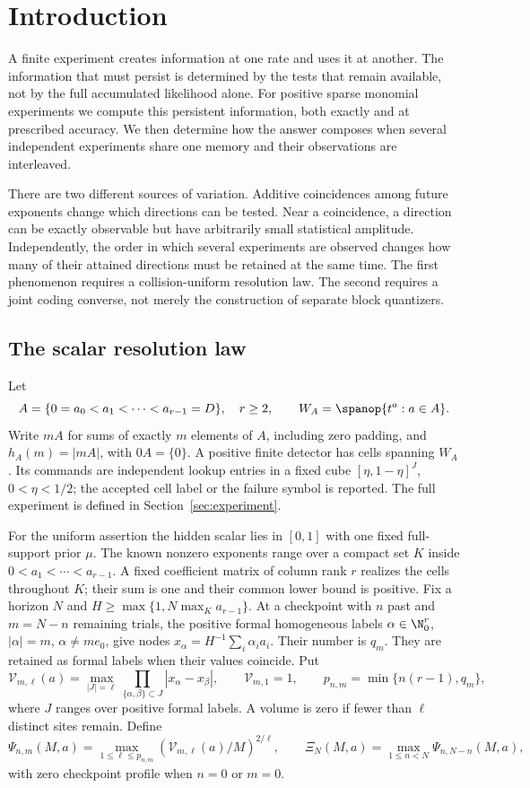 \section{Introduction}
A finite experiment creates information at one rate and uses it at
another. The information that must persist is determined by the tests
that remain available, not by the full accumulated likelihood alone.
For positive sparse monomial experiments we compute this persistent
information, both exactly and at prescribed accuracy. We then determine
how the answer composes when several independent experiments share one
memory and their observations are interleaved.

There are two different sources of variation. Additive coincidences among
future exponents change which directions can be tested. Near a coincidence,
a direction can be exactly observable but have arbitrarily small
statistical amplitude. Independently, the order in which several
experiments are observed changes how many of their attained directions
must be retained at the same time. The first phenomenon requires a
collision-uniform resolution law. The second requires a joint coding
converse, not merely the construction of separate block quantizers.

\subsection{The scalar resolution law}
Let
\[
 A=\{0=a_0<a_1<\cdots<a_{r-1}=D\},\quad r\ge2,
 \qquad W_A=\spanop\{t^a:a\in A\}.
\]
Write $mA$ for sums of exactly $m$ elements of $A$, including zero
padding, and $h_A(m)=|mA|$, with $0A=\{0\}$. A positive finite
detector has cells spanning $W_A$. Its commands are independent lookup
entries in a fixed cube $[\eta,1-\eta]^J$, $0<\eta<1/2$; the
accepted cell label or the failure symbol is reported. The full experiment
is defined in Section~\ref{sec:experiment}.

For the uniform assertion the hidden scalar lies in $[0,1]$ with one
fixed full-support prior $\mu$. The known nonzero exponents range over
a compact set $K$ inside $0<a_1<\cdots<a_{r-1}$. A fixed coefficient
matrix of column rank $r$ realizes the cells throughout $K$; their sum
is one and their common lower bound is positive. Fix a horizon $N$ and
$H\ge\max\{1,N\max_Ka_{r-1}\}$. At a checkpoint with $n$ past and
$m=N-n$ remaining trials, the positive formal homogeneous labels
$\alpha\in\N_0^r$, $|\alpha|=m$, $\alpha\ne me_0$, give nodes
$x_\alpha=H^{-1}\sum_i\alpha_i a_i$. Their number is $q_m$.
They are retained as formal labels when their values coincide. Put
\[
 \mathcal V_{m,\ell}(a)=
 \max_{|J|=\ell}\prod_{\{\alpha,\beta\}\subset J}|x_\alpha-x_\beta|,
 \qquad \mathcal V_{m,1}=1,
 \qquad p_{n,m}=\min\{n(r-1),q_m\},
\]
where $J$ ranges over positive formal labels. A volume is zero if fewer
than $\ell$ distinct sites remain. Define
\[
 \Psi_{n,m}(M,a)=\max_{1\le\ell\le p_{n,m}}
                  (\mathcal V_{m,\ell}(a)/M)^{2/\ell},
 \qquad \Xi_N(M,a)=\max_{1\le n<N}\Psi_{n,N-n}(M,a),
\]
with zero checkpoint profile when $n=0$ or $m=0$.

